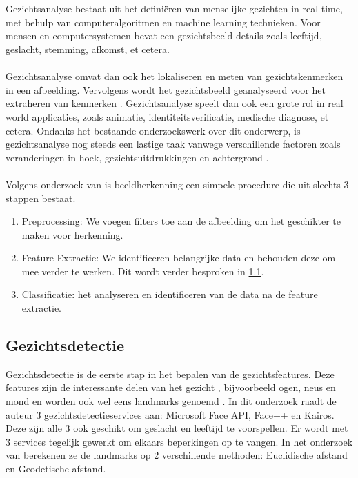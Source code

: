\chapter{}%
\label{ch:standvanzaken}

Gezichtsanalyse bestaat uit het definiëren van menselijke gezichten in real time, met behulp van computeralgoritmen en machine learning technieken. Voor mensen en computersystemen bevat een gezichtsbeeld details zoals leeftijd, geslacht, stemming, afkomst, et cetera. \\
\\ 
Gezichtsanalyse omvat dan ook het lokaliseren en meten van gezichtskenmerken in een afbeelding. Vervolgens wordt het gezichtsbeeld geanalyseerd voor het extraheren van kenmerken \autocite{Sanil2023}. Gezichtsanalyse speelt dan ook een grote rol in real world applicaties, zoals animatie, identiteitsverificatie, medische diagnose, et cetera. Ondanks het bestaande onderzoekswerk over dit onderwerp, is gezichtsanalyse nog steeds een lastige taak vanwege verschillende factoren zoals veranderingen in hoek, gezichtsuitdrukkingen en achtergrond \autocite{Siddiqi2022}. \\
\\
Volgens onderzoek van \textcite{Basystiuk2023} is beeldherkenning een simpele procedure die uit slechts 3 stappen bestaat. 
\begin{enumerate}
    \item Preprocessing: We voegen filters toe aan de afbeelding om het geschikter te maken voor herkenning.
    \item Feature Extractie: We identificeren belangrijke data en behouden deze om mee verder te werken. Dit wordt verder besproken in \ref{sub:gezichtsdetectie}.
    \item Classificatie: het analyseren en identificeren van de data na de feature extractie.
\end{enumerate}


\section{Gezichtsdetectie}\label{sub:gezichtsdetectie}
Gezichtsdetectie is de eerste stap in het bepalen van de gezichtsfeatures. Deze features zijn de interessante delen van het gezicht , bijvoorbeeld ogen, neus en mond en worden ook wel eens landmarks genoemd \autocite{Coppens2018}. In dit onderzoek raadt de auteur 3 gezichtsdetectieservices aan: Microsoft Face API, Face++ en Kairos. Deze zijn alle 3 ook geschikt om geslacht en leeftijd te voorspellen. Er wordt met 3 services tegelijk gewerkt om elkaars beperkingen op te vangen.
In het onderzoek van \textcite{Sanil2023} berekenen ze de landmarks op 2 verschillende methoden: Euclidische afstand en Geodetische afstand. \\

